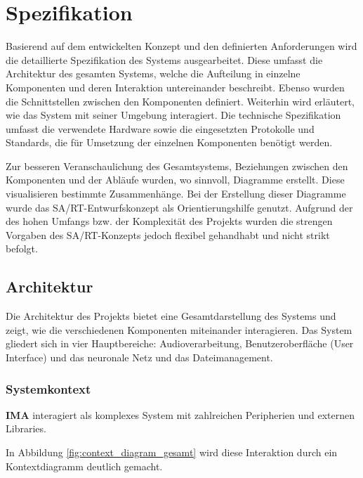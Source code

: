 \newpage
\section{Spezifikation}
Basierend auf dem entwickelten Konzept und den definierten Anforderungen wird die detaillierte Spezifikation des Systems ausgearbeitet. Diese umfasst die Architektur des gesamten Systems, welche die Aufteilung in einzelne Komponenten und deren Interaktion untereinander beschreibt. Ebenso wurden die Schnittstellen zwischen den Komponenten definiert. Weiterhin wird erläutert, wie das System mit seiner Umgebung interagiert. Die technische Spezifikation umfasst die verwendete Hardware sowie die eingesetzten Protokolle und Standards, die für Umsetzung der einzelnen Komponenten benötigt werden. 

Zur besseren Veranschaulichung des Gesamtsystems, Beziehungen zwischen den Komponenten und der Abläufe wurden, wo sinnvoll, Diagramme erstellt. Diese visualisieren bestimmte Zusammenhänge. Bei der Erstellung dieser Diagramme wurde das SA/RT-Entwurfskonzept als Orientierungshilfe genutzt. Aufgrund der des hohen Umfangs bzw. der Komplexität des Projekts wurden die strengen Vorgaben des SA/RT-Konzepts jedoch flexibel gehandhabt und nicht strikt befolgt.

\subsection{Architektur}
Die Architektur des Projekts bietet eine Gesamtdarstellung des Systems und zeigt, wie die verschiedenen Komponenten miteinander interagieren. Das System gliedert sich in vier Hauptbereiche: Audioverarbeitung, Benutzeroberfläche (User Interface) und das neuronale Netz und das Dateimanagement.

\subsubsection{Systemkontext}

\textbf{IMA} interagiert als komplexes System mit zahlreichen Peripherien und externen Libraries. 

In Abbildung \ref{fig:context_diagram_gesamt} wird diese Interaktion durch ein Kontextdiagramm deutlich gemacht.

